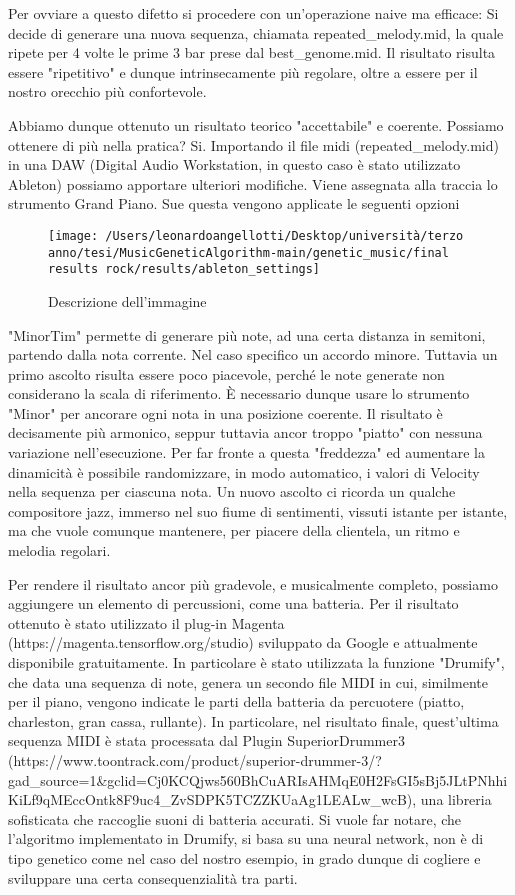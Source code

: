 \documentclass[a4paper,12pt]{report}
\begin{document}
Per ovviare a questo difetto si procedere con un'operazione naive ma efficace:
Si decide di generare una nuova sequenza, chiamata repeated_melody.mid, la quale ripete per 4 volte le prime 3 bar prese dal best_genome.mid.
Il risultato risulta essere "ripetitivo" e dunque intrinsecamente più regolare, oltre a essere per il nostro orecchio più confortevole.

Abbiamo dunque ottenuto un risultato teorico "accettabile" e coerente. 
Possiamo ottenere di più nella pratica?
Si.
Importando il file midi (repeated_melody.mid) in una DAW (Digital Audio Workstation, in questo caso è stato utilizzato Ableton) possiamo apportare ulteriori modifiche.
Viene assegnata alla traccia lo strumento Grand Piano. 
Sue questa vengono applicate le seguenti opzioni

\begin{figure}[h!]
    \centering
    \texttt{[image: /Users/leonardoangellotti/Desktop/università/terzo anno/tesi/MusicGeneticAlgorithm-main/genetic\_music/final results rock/results/ableton\_settings]} 
    \caption{Descrizione dell'immagine}
    \label{fig:immagine}
\end{figure}

"MinorTim" permette di generare più note, ad una certa distanza in semitoni, partendo dalla nota corrente. 
Nel caso specifico un accordo minore.
Tuttavia un primo ascolto risulta essere poco piacevole, perché le note generate non considerano la scala di riferimento.
È necessario dunque usare lo strumento "Minor" per ancorare ogni nota in una posizione coerente.
Il risultato è decisamente più armonico, seppur tuttavia ancor troppo "piatto" con nessuna variazione nell'esecuzione.
Per far fronte a questa "freddezza" ed aumentare la dinamicità è possibile randomizzare, in modo automatico, i valori di Velocity nella sequenza per ciascuna nota.
Un nuovo ascolto ci ricorda un qualche compositore jazz, immerso nel suo fiume di sentimenti, vissuti istante per istante, 
ma che vuole comunque mantenere, per piacere della clientela, un ritmo e melodia regolari.

Per rendere il risultato ancor più gradevole, e musicalmente completo, possiamo aggiungere un elemento di percussioni, come una batteria.
Per il risultato ottenuto è stato utilizzato il plug-in Magenta (https://magenta.tensorflow.org/studio) sviluppato da Google e attualmente disponibile gratuitamente.
In particolare è stato utilizzata la funzione "Drumify", che data una sequenza di note, genera un secondo file MIDI in cui, similmente per il piano, vengono indicate le parti della batteria da percuotere (piatto, charleston, gran cassa, rullante).
In particolare, nel risultato finale, quest'ultima sequenza MIDI è stata processata dal Plugin SuperiorDrummer3 (https://www.toontrack.com/product/superior-drummer-3/?gad_source=1&gclid=Cj0KCQjws560BhCuARIsAHMqE0H2FsGI5sBj5JLtPNhhiKiLf9qMEccOntk8F9uc4_ZvSDPK5TCZZKUaAg1LEALw_wcB),
una libreria sofisticata che raccoglie suoni di batteria accurati.
Si vuole far notare, che l'algoritmo implementato in Drumify, si basa su una neural network, non è di tipo genetico come nel caso del nostro esempio, in grado dunque di cogliere e sviluppare una certa consequenzialità tra parti.
\end{document}
